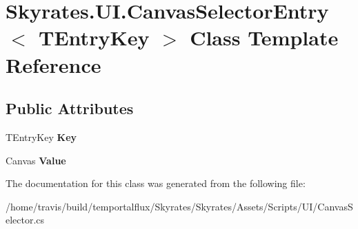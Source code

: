 \hypertarget{class_skyrates_1_1_u_i_1_1_canvas_selector_entry_3_01_t_entry_key_01_4}{\section{Skyrates.\-U\-I.\-Canvas\-Selector\-Entry$<$ T\-Entry\-Key $>$ Class Template Reference}
\label{class_skyrates_1_1_u_i_1_1_canvas_selector_entry_3_01_t_entry_key_01_4}
}
\subsection*{Public Attributes}
\begin{DoxyCompactItemize}
\item 
\hypertarget{class_skyrates_1_1_u_i_1_1_canvas_selector_entry_3_01_t_entry_key_01_4_aeaee1ef7dd1b48ca9db9ffe084bdd31c}{T\-Entry\-Key {\bfseries Key}}\label{class_skyrates_1_1_u_i_1_1_canvas_selector_entry_3_01_t_entry_key_01_4_aeaee1ef7dd1b48ca9db9ffe084bdd31c}

\item 
\hypertarget{class_skyrates_1_1_u_i_1_1_canvas_selector_entry_3_01_t_entry_key_01_4_ad333aa69c0559b9b8dbebc0b1d343b48}{Canvas {\bfseries Value}}\label{class_skyrates_1_1_u_i_1_1_canvas_selector_entry_3_01_t_entry_key_01_4_ad333aa69c0559b9b8dbebc0b1d343b48}

\end{DoxyCompactItemize}


The documentation for this class was generated from the following file\-:\begin{DoxyCompactItemize}
\item 
/home/travis/build/temportalflux/\-Skyrates/\-Skyrates/\-Assets/\-Scripts/\-U\-I/Canvas\-Selector.\-cs\end{DoxyCompactItemize}
